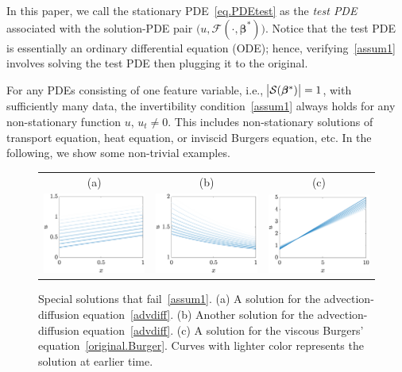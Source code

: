 \documentclass[a4paper,11pt]{article}
\newcommand{\bbeta}{\bm{\beta}}
\newcommand{\mS}{\mathcal{S}}
\begin{document}
In this paper, we call the stationary PDE~\eqref{eq.PDEtest} as the \textit{test PDE} associated with the solution-PDE pair $\big(u,\mathcal{F}(\cdot,\bbeta^*)\big)$. Notice that the test PDE is essentially an ordinary differential equation (ODE); hence, verifying~\eqref{assum1} involves solving  the test PDE then plugging it to the original.

For any PDEs consisting of one feature variable, i.e., $\abs{\mS(\bbeta^*)}=1$, with sufficiently many data, the invertibility condition~\eqref{assum1} always holds for any non-stationary function $u$, $u_t\neq 0$. This includes non-stationary solutions of transport equation, heat equation, or inviscid Burgers equation, etc. In the following, we show some non-trivial examples.
\begin{figure}
\centering
\begin{tabular}{ccc}
(a)&(b)&(c)\\
\includegraphics[width=2in]{Figures/advdiffExp2.eps}&
\includegraphics[width=2in]{Figures/advdiffexp1.eps}&
\includegraphics[width=2in]{Figures/vBurgersExp1.eps}
\end{tabular}
\caption{Special solutions that fail~\eqref{assum1}. (a) A solution for the advection-diffusion equation~\eqref{advdiff}. (b) Another solution for the advection-diffusion equation~\eqref{advdiff}. (c) A solution for the viscous Burgers' equation~\eqref{original.Burger}. Curves with lighter color represents the solution at earlier time.}\label{fig.invertibility}	
\end{figure}
\end{document}
